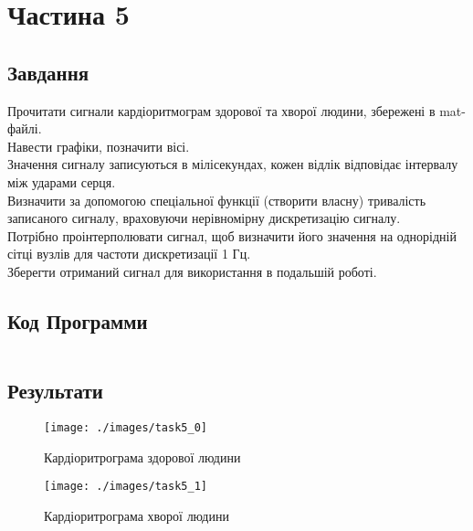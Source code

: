 \section{Частина 5}
\label{sec:task5}

\subsection{Завдання}
\label{subsec:task5_task}

Прочитати сигнали кардіоритмограм здорової та хворої людини, збережені в mat-файлі. \\
Навести графіки, позначити вісі. \\
Значення сигналу записуються в мілісекундах,
кожен відлік відповідає інтервалу між ударами серця. \\
Визначити за допомогою спеціальної функції (створити власну) тривалість записаного сигналу,
враховуючи нерівномірну дискретизацію сигналу. \\
Потрібно проінтерполювати сигнал, щоб визначити його значення
на однорідній сітці вузлів для частоти дискретизації 1 Гц. \\
Зберегти отриманий сигнал для використання в подальшій роботі.

\subsection{Код Программи}
\label{subsec:task5_code}
\inputminted{python}{../src/task5.py}

\subsection{Результати}
\label{subsec:task5_results}

\begin{figure}[!ht]
    \centering
    \texttt{[image: ./images/task5\_0]}
    \caption{Кардіоритрограма здорової людини}
    \label{fig:hr_healthy}
\end{figure}

\begin{figure}[!ht]
    \centering
    \texttt{[image: ./images/task5\_1]}
    \caption{Кардіоритрограма хворої людини}
    \label{fig:hr_apnea}
\end{figure}
